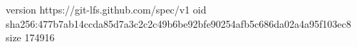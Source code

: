 version https://git-lfs.github.com/spec/v1
oid sha256:477b7ab14ccda85d7a3c2c2c49b6be92bfe90254afb5c686da02a4a95f103ec8
size 174916
